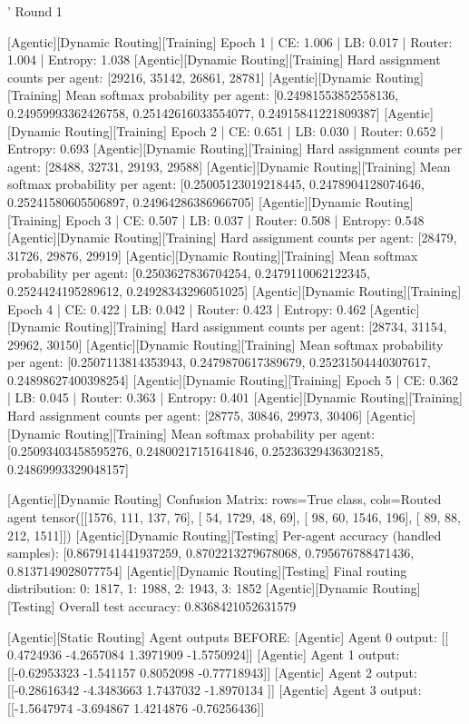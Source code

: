 '
Round 1

[Agentic][Dynamic Routing][Training] Epoch 1 | CE: 1.006 | LB: 0.017 | Router: 1.004 | Entropy: 1.038
[Agentic][Dynamic Routing][Training] Hard assignment counts per agent: [29216, 35142, 26861, 28781]
[Agentic][Dynamic Routing][Training] Mean softmax probability per agent: [0.24981553852558136, 0.24959993362426758, 0.25142616033554077, 0.24915841221809387]
[Agentic][Dynamic Routing][Training] Epoch 2 | CE: 0.651 | LB: 0.030 | Router: 0.652 | Entropy: 0.693
[Agentic][Dynamic Routing][Training] Hard assignment counts per agent: [28488, 32731, 29193, 29588]
[Agentic][Dynamic Routing][Training] Mean softmax probability per agent: [0.25005123019218445, 0.2478904128074646, 0.25241580605506897, 0.24964286386966705]
[Agentic][Dynamic Routing][Training] Epoch 3 | CE: 0.507 | LB: 0.037 | Router: 0.508 | Entropy: 0.548
[Agentic][Dynamic Routing][Training] Hard assignment counts per agent: [28479, 31726, 29876, 29919]
[Agentic][Dynamic Routing][Training] Mean softmax probability per agent: [0.2503627836704254, 0.2479110062122345, 0.2524424195289612, 0.24928343296051025]
[Agentic][Dynamic Routing][Training] Epoch 4 | CE: 0.422 | LB: 0.042 | Router: 0.423 | Entropy: 0.462
[Agentic][Dynamic Routing][Training] Hard assignment counts per agent: [28734, 31154, 29962, 30150]
[Agentic][Dynamic Routing][Training] Mean softmax probability per agent: [0.2507113814353943, 0.2479870617389679, 0.25231504440307617, 0.24898627400398254]
[Agentic][Dynamic Routing][Training] Epoch 5 | CE: 0.362 | LB: 0.045 | Router: 0.363 | Entropy: 0.401
[Agentic][Dynamic Routing][Training] Hard assignment counts per agent: [28775, 30846, 29973, 30406]
[Agentic][Dynamic Routing][Training] Mean softmax probability per agent: [0.25093403458595276, 0.24800217151641846, 0.25236329436302185, 0.24869993329048157]

[Agentic][Dynamic Routing] Confusion Matrix: rows=True class, cols=Routed agent
tensor([[1576,  111,  137,   76],
[  54, 1729,   48,   69],
[  98,   60, 1546,  196],
[  89,   88,  212, 1511]])
[Agentic][Dynamic Routing][Testing] Per-agent accuracy (handled samples): [0.8679141441937259, 0.8702213279678068, 0.795676788471436, 0.8137149028077754]
[Agentic][Dynamic Routing][Testing] Final routing distribution: {0: 1817, 1: 1988, 2: 1943, 3: 1852}
[Agentic][Dynamic Routing][Testing] Overall test accuracy: 0.8368421052631579

[Agentic][Static Routing] Agent outputs BEFORE:
[Agentic] Agent 0 output: [[ 0.4724936 -4.2657084  1.3971909 -1.5750924]]
[Agentic] Agent 1 output: [[-0.62953323 -1.541157    0.8052098  -0.77718943]]
[Agentic] Agent 2 output: [[-0.28616342 -4.3483663   1.7437032  -1.8970134 ]]
[Agentic] Agent 3 output: [[-1.5647974  -3.694867    1.4214876  -0.76256436]]

